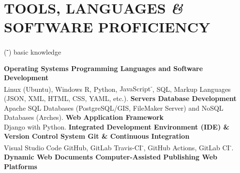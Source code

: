 \documentclass{article}
\newcommand{\fr}[1]{} %
\newcommand{\en}[1]{#1}   %
\begin{document}
\section*{\fr{OUTILS, LANGAGES \textit{\&} PROGRAMMES INFORMATIQUES MAÎTRISÉS}\en{TOOLS, LANGUAGES \textit{\&} SOFTWARE PROFICIENCY}}
\begin{center}(\textbf{\textsuperscript{-}}) \fr{notions}\en{basic knowledge}\end{center}
\smallbreak
\textbf{\fr{Systèmes d'exploitation {\textbar} Langages de programmation et développement de logiciels}\en{Operating Systems {\textbar} Programming Languages and Software Development}} \\
\fr{Linux (Ubuntu), Windows \textbf{{\textbar}} \textsf{R}, \textsf{Python}, \textsf{JavaScript\textsuperscript{-}}, SQL, langages de balisage (JSON, XML, HTML, CSS, YAML, etc.).}
\en{Linux (Ubuntu), Windows \textbf{{\textbar}} \textsf{R}, \textsf{Python}, \textsf{JavaScript\textsuperscript{-}}, SQL, Markup Languages (JSON, XML, HTML, CSS, YAML, etc.).}
\smallbreak
\textbf{\fr{Serveurs {\textbar} Développement de bases de données}\en{Servers {\textbar} Database Development}} \\
\fr{Apache \textbf{{\textbar}} Bases de données SQL (PostgreSQL/GIS, FileMaker Server) et bases de données NoSQL (Arches).}
\en{Apache \textbf{{\textbar}} SQL Databases (PostgreSQL/GIS, FileMaker Server) and NoSQL Databases (Arches).}
\smallbreak
\textbf{\fr{Framework d'application web}\en{Web Application Framework}} \\
\fr{\textsf{Django} avec \textsf{Python}.}
\en{\textsf{Django} with \textsf{Python}.}
\smallbreak
\textbf{\fr{Environnement de développement intégré (IDE) \& Système de contrôle de version Git \& Intégration continue}\en{Integrated Development Environment (IDE) \& Version Control System Git \& Continuous Integration}} \\
\fr{Visual Studio Code \textbf{{\textbar}} GitHub, GitLab \textbf{{\textbar}} Travis-CI\textsuperscript{-}, GitHub Actions, GitLab CI\textsuperscript{-}.}
\en{Visual Studio Code \textbf{{\textbar}} GitHub, GitLab \textbf{{\textbar}} Travis-CI\textsuperscript{-}, GitHub Actions, GitLab CI\textsuperscript{-}.}
\smallbreak
\textbf{\fr{Documents web dynamiques {\textbar} Publication assistée par ordinateur {\textbar} Plateformes web}\en{Dynamic Web Documents {\textbar} Computer-Assisted Publishing {\textbar} Web Platforms}} \\
\fr{\textsf{Quarto}, \textsf{Rmarkdown}, \textsf{RShiny}, \textsf{Plotly}, \textsf{Jupyter Notebook} \textbf{{\textbar}} \LaTeX, \textsf{Markdown}, Microsoft Office \textbf{{\textbar}} RPubs, HAL, Zenodo.}
\end{document}
